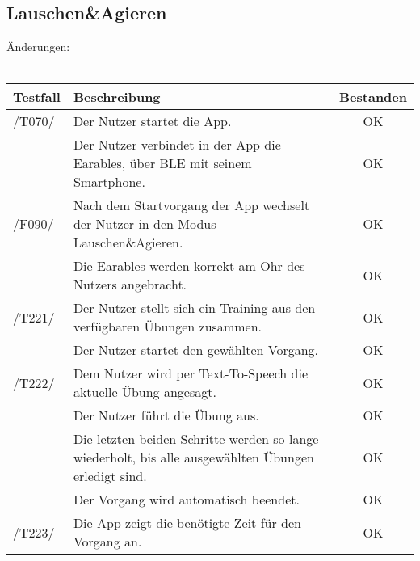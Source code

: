 \documentclass[a4paper,12pt]{article}
\newcommand{\testok}[0]{
	\cellcolor{green!25} OK
}
\begin{document}
\subsection{Lauschen\&Agieren}
Änderungen:
\\
\\
\begin{tabular}{ |p{1.5cm} | p{12cm} | c| }
	\hline
	\textbf{Testfall} & \textbf{Beschreibung} & \textbf{Bestanden}\\
	\hline
	/T070/ & Der Nutzer startet die App. & \testok \\
	\hline
	& Der Nutzer verbindet in der App die Earables, über BLE mit seinem Smartphone. & \testok  \\
	\hline
	/F090/ & Nach dem Startvorgang der App wechselt der Nutzer in den Modus \glqq Lauschen\&Agieren\grqq . & \testok  \\
	\hline
	& Die Earables werden korrekt am Ohr des Nutzers angebracht. & \testok  \\
	\hline
	/T221/ & Der Nutzer stellt sich ein Training aus den verfügbaren Übungen zusammen. & \testok  \\
	\hline
	& Der Nutzer startet den gewählten Vorgang. & \testok  \\
	\hline
	/T222/ & Dem Nutzer wird per Text-To-Speech die aktuelle Übung angesagt. & \testok  \\
	\hline
	& Der Nutzer führt die Übung aus. & \testok  \\
	\hline
	& Die letzten beiden Schritte werden so lange wiederholt, bis alle ausgewählten Übungen erledigt sind. & \testok  \\
	\hline
	& Der Vorgang wird automatisch beendet. & \testok  \\
	\hline
	/T223/ & Die App zeigt die benötigte Zeit für den Vorgang an. & \testok  \\
	\hline
\end{tabular}
\end{document}
